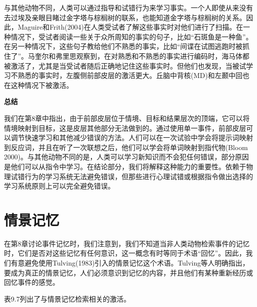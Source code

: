 \par
与其他动物不同，人类可以通过指导和试错行为来学习事实。一个人即使从来没有去过埃及亲眼目睹过金字塔与棕榈树的联系，也能知道金字塔与棕榈树的关系。因此，Maguire和Frith(2004)在人类受试者了解这些事实时对他们进行了扫描。在一种情况下，受试者阅读一些关于众所周知的事实的句子，比如“石斑鱼是一种鱼”。在另一种情况下，这些句子教给他们不熟悉的事实，比如“间谍在试图逃跑时被抓住了”。马奎尔和弗里思观察到，在对熟悉和不熟悉的事实进行编码时，海马体都被激活了，尤其是当受试者随后正确地记住这些事实时。但他们也发现，当被试学习不熟悉的事实时，左腹侧前部皮层的激活更大。丘脑中背核(MD)和左颞中回也在这种情况下被激活。
\par
\textbf{总结}
\par
我们在第8章中指出，由于前部皮层位于情境、目标和结果层次的顶端，它可以将情境映射到目标，这是皮层其他部分无法做到的。通过使用单一事件，前部皮层可以调节快速学习和其他减少错误的方法。人们可以在一次试验中学会将提示词映射到反应词，并且在听了一次联想之后，他们可以学会将单词映射到指代物(Bloom 2000)。与其他动物不同的是，人类可以学习新知识而不会犯任何错误，部分原因是他们可以从指令中学习。在结论部分，我们将解释这种能力的重要性。依赖于物理试错行为的学习系统无法避免错误，但那些进行心理试错或根据指令做出选择的学习系统原则上可以完全避免错误。
\section{情景记忆}
在第8章讨论事件记忆时，我们注意到，我们不知道当非人类动物检索事件的记忆时，它们是否对这些记忆有任何意识，这一概念有时等同于术语“回忆”。因此，我们有意避免使用Tulving(1983)引入的情景记忆这个术语。Tulving等人明确指出，要成为真正的情景记忆，人们必须意识到记忆的内容，并且他们有某种重新经历或回忆事件的感觉。
\par
表9.7列出了与情景记忆检索相关的激活。
